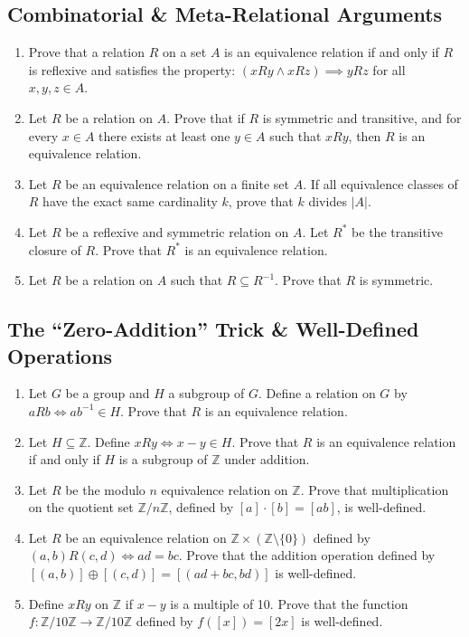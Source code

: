 \documentclass[11pt, a4paper]{article}
\theoremstyle{definition}
\theoremstyle{remark}
\newcommand{\Z}{\mathbb{Z}}
\begin{document}
\subsection{Combinatorial \& Meta-Relational Arguments}
\begin{enumerate}[label=\textbf{\arabic*.}, start=11]
    \item Prove that a relation $R$ on a set $A$ is an equivalence relation if and only if $R$ is reflexive and satisfies the property: $(xRy \land xRz) \implies yRz$ for all $x, y, z \in A$.
    \item Let $R$ be a relation on $A$. Prove that if $R$ is symmetric and transitive, and for every $x \in A$ there exists at least one $y \in A$ such that $xRy$, then $R$ is an equivalence relation.
    \item Let $R$ be an equivalence relation on a finite set $A$. If all equivalence classes of $R$ have the exact same cardinality $k$, prove that $k$ divides $|A|$.
    \item Let $R$ be a reflexive and symmetric relation on $A$. Let $R^*$ be the transitive closure of $R$. Prove that $R^*$ is an equivalence relation.
    \item Let $R$ be a relation on $A$ such that $R \subseteq R^{-1}$. Prove that $R$ is symmetric.
\end{enumerate}

\subsection{The ``Zero-Addition'' Trick \& Well-Defined Operations}
\begin{enumerate}[label=\textbf{\arabic*.}, start=16]
    \item Let $G$ be a group and $H$ a subgroup of $G$. Define a relation on $G$ by $aRb \iff ab^{-1} \in H$. Prove that $R$ is an equivalence relation.
    \item Let $H \subseteq \Z$. Define $xRy \iff x - y \in H$. Prove that $R$ is an equivalence relation if and only if $H$ is a subgroup of $\Z$ under addition.
    \item Let $R$ be the modulo $n$ equivalence relation on $\Z$. Prove that multiplication on the quotient set $\Z/n\Z$, defined by $[a] \cdot [b] = [ab]$, is well-defined.
    \item Let $R$ be an equivalence relation on $\Z \times (\Z \setminus \{0\})$ defined by $(a,b) R (c,d) \iff ad = bc$. Prove that the addition operation defined by $[(a,b)] \oplus [(c,d)] = [(ad+bc, bd)]$ is well-defined.
    \item Define $xRy$ on $\Z$ if $x - y$ is a multiple of 10. Prove that the function $f: \Z/10\Z \to \Z/10\Z$ defined by $f([x]) = [2x]$ is well-defined.
\end{enumerate}
\end{document}
